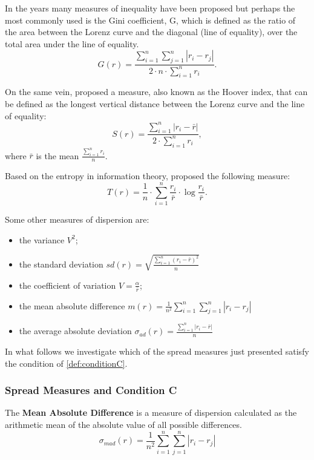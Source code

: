 \documentclass[version=3.21, pagesize, twoside=off, bibliography=totoc, DIV=calc, fontsize=12pt, a4paper]{scrartcl}
\begin{document}
In the years many measures of inequality have been proposed \citep{Jackman1974, Rubinson1977, Martin1971, Ray1973} but perhaps the most commonly used is the Gini coefficient, G, which is defined as the ratio of the area between the Lorenz curve and the diagonal (line of equality), over the total area under the line of equality.
\[G(r)= \frac{\sum_{i=1}^{n}\sum_{j=1}^{n}|r_i-r_j|}{2 \cdot n \cdot \sum_{i=1}^{n} r_i}.\]

On the same vein, \citet{Schutz1951} proposed a measure, also known as the Hoover index, that can be defined as the longest vertical distance between the Lorenz curve and the line of equality:
\[S(r)= \frac{\sum_{i=1}^{n}|r_i-\bar{r}|}{2 \cdot \sum_{i=1}^{n} r_i},\]
where $\bar{r}$ is the mean $\frac{\sum_{i=1}^{n}r_i}{n}$.

Based on the entropy in information theory, \citet{Theil1967} proposed the following measure:
\[T(r)= \frac{1}{n} \cdot \sum_{i=1}^{n}\frac{r_i}{\bar{r}} \cdot \log \frac{r_i}{\bar{r}}.\]


Some other measures of dispersion are:
\begin{itemize}
	\item the variance $V^2$;
	\item the standard deviation $sd(r)= \sqrt{\frac{\sum_{i=1}^{n}(r_i-\bar{r})^2}{n}}$
	\item the coefficient of variation $V=\frac{\alpha}{\bar{r}}$;
	\item the mean absolute difference $m(r)= \frac{1}{n^2} \sum_{i=1}^{n}\sum_{j=1}^{n}|r_i-r_j|$
	\item the average absolute deviation $\sigma_{ad}(r)= \frac{\sum_{i=1}^{n}|r_i-\bar{r}|}{n}$
\end{itemize}
  
In what follows we investigate which of the spread measures just presented satisfy the condition of \cref{def:conditionC}.
\subsubsection{Spread Measures and Condition C}
The \textbf{Mean Absolute Difference} is a measure of dispersion calculated as the arithmetic mean of the absolute value of all possible differences. 
\[\sigma_{mad}(r)= \frac{1}{n^2} \sum_{i=1}^{n}\sum_{j=1}^{n}|r_i-r_j| \]
\end{document}
